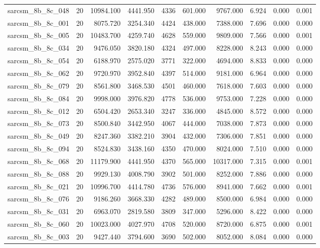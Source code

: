 \begin{tabular}{lrrrrrrrrr}
sarcsm\_8b\_8c\_048 & 20 & 10984.100 & 4441.950 & 4336 & 601.000 & 9767.000 & 6.924 & 0.000 & 0.001 \\
sarcsm\_8b\_8c\_001 & 20 & 8075.720 & 3254.340 & 4424 & 438.000 & 7388.000 & 7.696 & 0.000 & 0.000 \\
sarcsm\_8b\_8c\_005 & 20 & 10483.700 & 4259.740 & 4628 & 559.000 & 9809.000 & 7.566 & 0.000 & 0.001 \\
sarcsm\_8b\_8c\_034 & 20 & 9476.050 & 3820.180 & 4324 & 497.000 & 8228.000 & 8.243 & 0.000 & 0.000 \\
sarcsm\_8b\_8c\_054 & 20 & 6188.970 & 2575.020 & 3771 & 322.000 & 4694.000 & 8.833 & 0.000 & 0.000 \\
sarcsm\_8b\_8c\_062 & 20 & 9720.970 & 3952.840 & 4397 & 514.000 & 9181.000 & 6.964 & 0.000 & 0.000 \\
sarcsm\_8b\_8c\_079 & 20 & 8561.800 & 3468.530 & 4501 & 460.000 & 7618.000 & 7.603 & 0.000 & 0.000 \\
sarcsm\_8b\_8c\_084 & 20 & 9998.000 & 3976.820 & 4778 & 536.000 & 9753.000 & 7.228 & 0.000 & 0.000 \\
sarcsm\_8b\_8c\_012 & 20 & 6504.420 & 2653.340 & 3247 & 336.000 & 4845.000 & 8.572 & 0.000 & 0.000 \\
sarcsm\_8b\_8c\_073 & 20 & 8500.840 & 3442.950 & 4067 & 444.000 & 7038.000 & 7.873 & 0.000 & 0.000 \\
sarcsm\_8b\_8c\_049 & 20 & 8247.360 & 3382.210 & 3904 & 432.000 & 7306.000 & 7.851 & 0.000 & 0.000 \\
sarcsm\_8b\_8c\_094 & 20 & 8524.830 & 3438.160 & 4350 & 470.000 & 8024.000 & 7.510 & 0.000 & 0.000 \\
sarcsm\_8b\_8c\_068 & 20 & 11179.900 & 4441.950 & 4370 & 565.000 & 10317.000 & 7.315 & 0.000 & 0.001 \\
sarcsm\_8b\_8c\_088 & 20 & 9929.130 & 4008.790 & 3902 & 501.000 & 8252.000 & 7.886 & 0.000 & 0.000 \\
sarcsm\_8b\_8c\_021 & 20 & 10996.700 & 4414.780 & 4736 & 576.000 & 8941.000 & 7.662 & 0.000 & 0.001 \\
sarcsm\_8b\_8c\_076 & 20 & 9186.260 & 3668.330 & 4282 & 489.000 & 8500.000 & 6.984 & 0.000 & 0.000 \\
sarcsm\_8b\_8c\_031 & 20 & 6963.070 & 2819.580 & 3809 & 347.000 & 5296.000 & 8.422 & 0.000 & 0.000 \\
sarcsm\_8b\_8c\_060 & 20 & 10023.000 & 4027.970 & 4708 & 520.000 & 8720.000 & 6.875 & 0.000 & 0.001 \\
sarcsm\_8b\_8c\_003 & 20 & 9427.440 & 3794.600 & 3690 & 502.000 & 8052.000 & 8.084 & 0.000 & 0.000 \\

\end{tabular}
